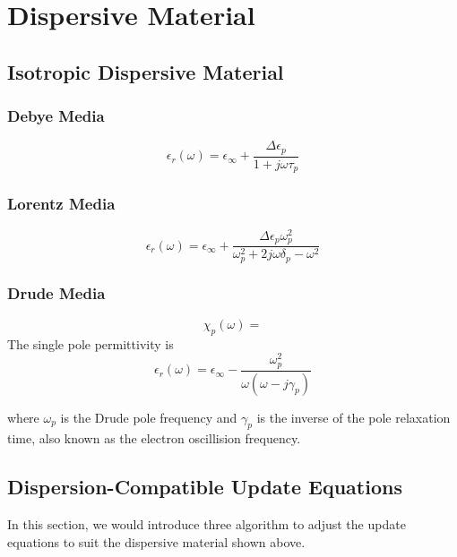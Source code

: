 \section{Dispersive Material}

\subsection{Isotropic Dispersive Material}
\subsubsection{Debye Media}

\begin{displaymath}
  \epsilon_r(\omega) = \epsilon_{\infty} + \frac{\Delta\epsilon_p}{1+j\omega\tau_p}
\end{displaymath}

\subsubsection{Lorentz Media}


\begin{displaymath}
  \epsilon_r(\omega) = \epsilon_{\infty} + \frac{\Delta\epsilon_p\omega_p^2}{\omega_p^2 + 2j\omega\delta_p - \omega^2}
\end{displaymath}


\subsubsection{Drude Media}
\[
\chi_p(\omega) = 
\]
The single pole permittivity is 
\begin{displaymath}
  \epsilon_r(\omega) = \epsilon_{\infty} - \frac{\omega_p^2}{\omega(\omega-j\gamma_p)}
\end{displaymath}

where $\omega_p$ is the Drude pole frequency and $\gamma_p$ is the inverse of the pole relaxation time, also known as the
electron oscillision frequency.



\subsection{Dispersion-Compatible Update Equations}

In this section, we would introduce three algorithm to adjust the update equations to suit the dispersive material shown
above.\\

